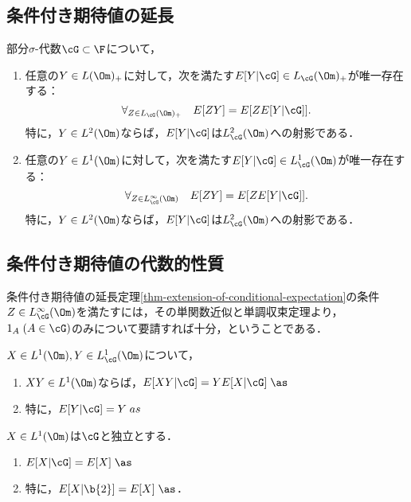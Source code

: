 \documentclass[uplatex,dvipdfmx]{jsreport}
\begin{document}
\subsection{条件付き期待値の延長}

\begin{theorem}\label{thm-extension-of-conditional-expectation}
    部分$\sigma$-代数$\cG\subset\F$について，
    \begin{enumerate}
        \item 任意の$Y\in L(\Om)_+$に対して，次を満たす$E[Y|\cG]\in L_\cG(\Om)_+$が唯一存在する：
        \[\forall_{Z\in L_\cG(\Om)_+}\quad E[ZY]=E[ZE[Y|\cG]].\]
        特に，$Y\in L^2(\Om)$ならば，$E[Y|\cG]$は$L^2_\cG(\Om)$への射影である．
        \item 任意の$Y\in L^1(\Om)$に対して，次を満たす$E[Y|\cG]\in L_\cG^1(\Om)$が唯一存在する：
        \[\forall_{Z\in L^\infty_\cG(\Om)}\quad E[ZY]=E[ZE[Y|\cG]].\]
        特に，$Y\in L^2(\Om)$ならば，$E[Y|\cG]$は$L^2_\cG(\Om)$への射影である．
    \end{enumerate}
\end{theorem}

\subsection{条件付き期待値の代数的性質}

\begin{tcolorbox}[colframe=ForestGreen, colback=ForestGreen!10!white,breakable,colbacktitle=ForestGreen!40!white,coltitle=black,fonttitle=\bfseries\sffamily,
    title=]
    条件付き期待値の延長定理\ref{thm-extension-of-conditional-expectation}の条件$Z\in L^\infty_\cG(\Om)$を満たすには，その単関数近似と単調収束定理より，$1_A\;(A\in\cG)$のみについて要請すれば十分，ということである．
\end{tcolorbox}

\begin{proposition}[可測関数の取り出し]
    $X\in L^1(\Om),Y\in L^1_\cG(\Om)$について，
    \begin{enumerate}
        \item $XY\in L^1(\Om)$ならば，$E[XY|\cG]=YE[X|\cG]\;\as$
        \item 特に，$E[Y|\cG]=Y\;as$
    \end{enumerate}
\end{proposition}

\begin{proposition}[独立確率変数に対する性質]
    $X\in L^1(\Om)$は$\cG$と独立とする．
    \begin{enumerate}
        \item $E[X|\cG]=E[X]\;\as$
        \item 特に，$E[X|\b{2}]=E[X]\;\as$．
    \end{enumerate}
\end{proposition}
\end{document}
